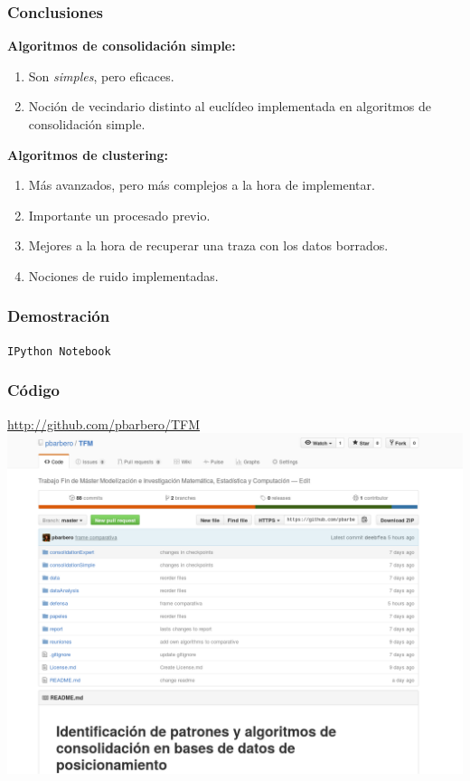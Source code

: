 \documentclass[10pt, spanish]{beamer}
\begin{document}
\begin{frame}[fragile]
\frametitle{Conclusiones}
\textbf{Algoritmos de consolidaci\'on simple:}
\begin{enumerate}[<+- | alert@+>]
	\item Son \textit{simples}, pero eficaces.
	\item Noci\'on de vecindario distinto al eucl\'ideo implementada en algoritmos de consolidaci\'on simple.
\end{enumerate}

\textbf{Algoritmos de clustering:}
\begin{enumerate}[<+- | alert@+>]
	\item M\'as avanzados, pero m\'as complejos a la hora de implementar.
	\item Importante un procesado previo.
	\item Mejores a la hora de recuperar una traza con los datos borrados.
	\item Nociones de ruido implementadas.
\end{enumerate}
\end{frame}


\begin{frame}[fragile]
\frametitle{Demostraci\'on}
\texttt{IPython Notebook}
\end{frame}

\begin{frame}[fragile]
	\frametitle{C\'odigo}
	\begin{center}
		\href{http://github.com/pbarbero/TFM}{http://github.com/pbarbero/TFM}
		\includegraphics[scale=.3]{github.png}
	\end{center}
\end{frame}
\end{document}
